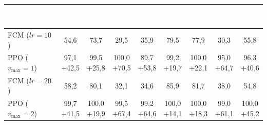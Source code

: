 \begin{table}[H]
\centering
\renewcommand{\arraystretch}{1.35}
\setlength{\tabcolsep}{4pt}
\small
\begin{tabular}{l c c c c c c c c}
\toprule
\rowcolor{headerbg}
\textcolor{white}{\textbf{Vel.\ / metodo}} &
\textcolor{white}{\textbf{SR\%}} &
\textcolor{white}{\textbf{V0}} &
\textcolor{white}{\textbf{V1}} &
\textcolor{white}{\textbf{V2}} &
\textcolor{white}{\textbf{V3}} &
\textcolor{white}{\textbf{Q1/4}} &
\textcolor{white}{\textbf{Q1/2}} &
\textcolor{white}{\textbf{Q3/4}} \\
\midrule
FCM ($lr{=}10$) & 54{,}6 & 73{,}7 & 29{,}5 & 35{,}9 & 79{,}5 & 77{,}9 & 30{,}3 & 55{,}8 \\
\rowcolor{rowalt}
PPO ($v_{\max}{=}1$) & \shortstack{97{,}1\\[-1pt]{\scriptsize\textcolor{green!50!black}{+42{,}5}}} & \shortstack{99{,}5\\[-1pt]{\scriptsize\textcolor{green!50!black}{+25{,}8}}} & \shortstack{100{,}0\\[-1pt]{\scriptsize\textcolor{green!50!black}{+70{,}5}}} & \shortstack{89{,}7\\[-1pt]{\scriptsize\textcolor{green!50!black}{+53{,}8}}} & \shortstack{99{,}2\\[-1pt]{\scriptsize\textcolor{green!50!black}{+19{,}7}}} & \shortstack{100{,}0\\[-1pt]{\scriptsize\textcolor{green!50!black}{+22{,}1}}} & \shortstack{95{,}0\\[-1pt]{\scriptsize\textcolor{green!50!black}{+64{,}7}}} & \shortstack{96{,}3\\[-1pt]{\scriptsize\textcolor{green!50!black}{+40{,}6}}} \\
\midrule
FCM ($lr{=}20$) & 58{,}2 & 80{,}1 & 32{,}1 & 34{,}6 & 85{,}9 & 81{,}7 & 38{,}0 & 54{,}8 \\
\rowcolor{rowalt}
PPO ($v_{\max}{=}2$) & \shortstack{99{,}7\\[-1pt]{\scriptsize\textcolor{green!50!black}{+41{,}5}}} & \shortstack{100{,}0\\[-1pt]{\scriptsize\textcolor{green!50!black}{+19{,}9}}} & \shortstack{99{,}5\\[-1pt]{\scriptsize\textcolor{green!50!black}{+67{,}4}}} & \shortstack{99{,}2\\[-1pt]{\scriptsize\textcolor{green!50!black}{+64{,}6}}} & \shortstack{100{,}0\\[-1pt]{\scriptsize\textcolor{green!50!black}{+14{,}1}}} & \shortstack{100{,}0\\[-1pt]{\scriptsize\textcolor{green!50!black}{+18{,}3}}} & \shortstack{99{,}0\\[-1pt]{\scriptsize\textcolor{green!50!black}{+61{,}1}}} & \shortstack{100{,}0\\[-1pt]{\scriptsize\textcolor{green!50!black}{+45{,}2}}} \\

\end{tabular}
\end{table}
